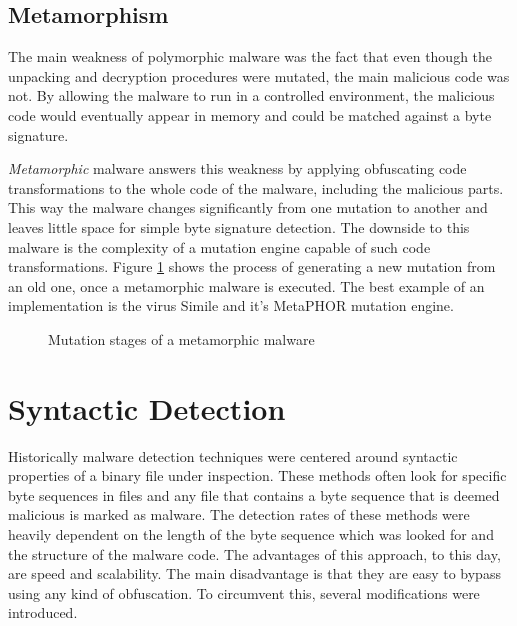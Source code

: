 \subsection{Metamorphism}
The main weakness of polymorphic malware was the fact that even though the unpacking and decryption procedures were mutated, the main malicious code was not. By allowing the malware to run in a controlled environment, the malicious code would eventually appear in memory and could be matched against a byte signature.

\emph{Metamorphic} malware answers this weakness by applying obfuscating code transformations to the whole code of the malware, including the malicious parts. This way the malware changes significantly from one mutation to another and leaves little space for simple byte signature detection. The downside to this malware is the complexity of a mutation engine capable of such code transformations. Figure \ref{fig_metamorph} shows the process of generating a new mutation from an old one, once a metamorphic malware is executed. The best example of an implementation is the virus Simile and it's MetaPHOR mutation engine.

\begin{figure}[H]
    \centering
    \caption{Mutation stages of a metamorphic malware}
    \label{fig_metamorph}
\end{figure}

\section{Syntactic Detection}
Historically malware detection techniques were centered around syntactic properties of a binary file under inspection. These methods often look for specific byte sequences in files and any file that contains a byte sequence that is deemed malicious is marked as malware. The detection rates of these methods were heavily dependent on the length of the byte sequence which was looked for and the structure of the malware code. The advantages of this approach, to this day, are speed and scalability. The main disadvantage is that they are easy to bypass using any kind of obfuscation. To circumvent this, several modifications were introduced.

